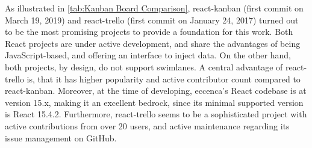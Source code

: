 \noindent As illustrated in \autoref{tab:Kanban Board Comparison}, react-kanban (first commit on March 19, 2019) and react-trello (first commit on January 24, 2017) turned out to be the most promising projects to provide a foundation for this work. Both React projects are under active development, and share the advantages of being JavaScript-based, and offering an interface to inject data. On the other hand, both projects, by design, do not support swimlanes. A central advantage of react-trello is, that it has higher popularity and active contributor count compared to react-kanban. Moreover, at the time of developing, eccenca’s React codebase is at version 15.x, making it an excellent bedrock, since its minimal supported version is React 15.4.2. Furthermore, react-trello seems to be a sophisticated project with active contributions from over 20 users, and active maintenance regarding its issue management on GitHub.






